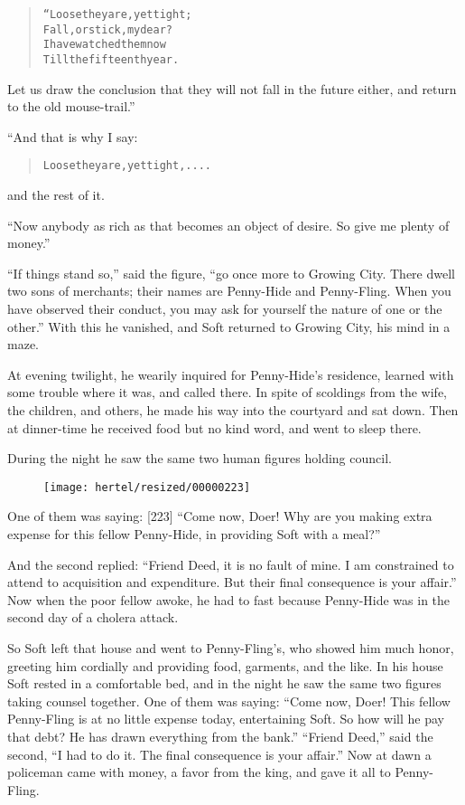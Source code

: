 \documentclass[article, twoside, 10pt]{memoir}
\renewenvironment{verbatim}{%
\begin{quote}%
\vskip -10pt%
\begin{alltt}\normalfont\small}{\end{alltt}%
\end{quote}%
\vskip -10pt
} %
\begin{document}
\begin{verbatim}
“Loose they are, yet tight;
    Fall, or stick, my dear?
I have watched them now
    Till the fifteenth year.
\end{verbatim}
Let us draw the conclusion that they will not fall in the future
either, and return to the old mouse-trail.”

“And that is why I say:

\begin{verbatim}
Loose they are, yet tight, ....
\end{verbatim}
and the rest of it.

``Now anybody as rich as that becomes an object of desire. So give me plenty of money.''

``If things stand so,'' said the figure,
``go once more to Growing City. There dwell two sons of merchants; their names are Penny-Hide and Penny-Fling. When you have observed their conduct, you may ask for yourself the nature of one or the other.''
With this he vanished, and Soft returned to Growing City, his mind
in a maze.

At evening twilight, he wearily inquired for Penny-Hide's
residence, learned with some trouble where it was, and called
there. In spite of scoldings from the wife, the children, and
others, he made his way into the courtyard and sat down. Then at
dinner-time he received food but no kind word, and went to sleep
there.

During the night he saw the same two human figures holding council.
\begin{figure}[p]\texttt{[image: hertel/resized/00000223]}\end{figure}One of them was saying: [223]
``Come now, Doer! Why are you making extra expense for this fellow Penny-Hide, in providing Soft with a meal?''

And the second replied:
``Friend Deed, it is no fault of mine. I am constrained to attend to acquisition and expenditure. But their final consequence is your affair.''
Now when the poor fellow awoke, he had to fast because Penny-Hide
was in the second day of a cholera attack.

So Soft left that house and went to Penny-Fling's, who showed him
much honor, greeting him cordially and providing food, garments,
and the like. In his house Soft rested in a comfortable bed, and in
the night he saw the same two figures taking counsel together. One
of them was saying:
``Come now, Doer! This fellow Penny-Fling is at no little expense today, entertaining Soft. So how will he pay that debt? He has drawn everything from the bank.''
``Friend Deed,'' said the second,
``I had to do it. The final consequence is your affair.'' Now at
dawn a policeman came with money, a favor from the king, and gave
it all to Penny-Fling.
\end{document}
